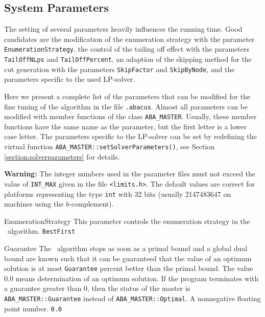 \subsection{System Parameters}
\label{section:parameters}

The setting of several parameters heavily 
influences the running time. Good candidates are the modification
of the enumeration strategy with the parameter {\tt EnumerationStrategy}, 
the control of the tailing off effect with the parameters
{\tt TailOffNLps} and {\tt TailOffPercent}, an adaption of the
skipping method for the cut generation with the parameters
{\tt SkipFactor} and {\tt SkipByNode}, and the parameters 
specific to the used LP-solver.

Here we present a complete list of the parameters that can be modified
for the fine tuning of the algorithm in the 
file {\tt .abacus}.
Almost all parameters can be modified with member functions of the
class {\tt ABA\_MASTER}. Usually, these member functions have the same name
as the parameter, but the first letter is a lower case letter.
The parameters specific to the LP-solver can be set by redefining the 
virtual function {\tt ABA\_MASTER::setSolverParameters()}, see Section~
\ref{section:solverparameters} for details.

\smallskip\noindent
{\bf Warning:} The integer numbers used in the parameter files must
               not exceed the value of {\tt INT\_MAX} 
               given in the file {\tt <limits.h>}.
               The default values are correct for platforms representing
               the type {\tt int} with 32 bits (usually 2147483647 on
               machines using the $b$-complement).

\parameter
{EnumerationStrategy}
{This parameter controls the enumeration strategy
 in the \bab\ algorithm.}
{
}
{{\tt BestFirst}}                  

\parameter
{Guarantee}
{The \bab\ algorithm stops as soon as a primal bound and a
 global dual bound are known such that it can be guaranteed
 that the
 value of an optimum solution is at most {\tt Guarantee} percent better than
 the primal bound. 
 The value 0.0 means determination
 of an optimum solution. If the program terminates with a guarantee greater
 than 0, then the status of the master is {\tt ABA\_MASTER::Guarantee} instead of
 {\tt ABA\_MASTER::Optimal}.
}
{A nonnegative floating point number.}
{{\tt 0.0}}

